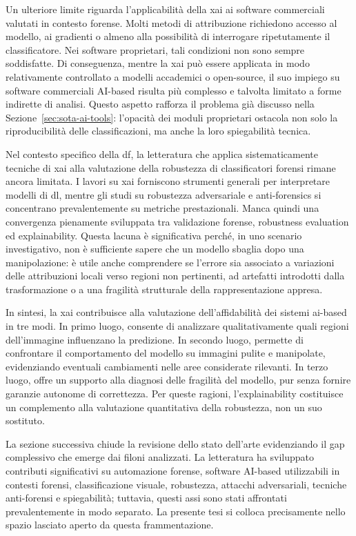 Un ulteriore limite riguarda l'applicabilità della \gls{xai} ai software commerciali valutati in contesto forense. Molti metodi di attribuzione richiedono accesso al modello, ai gradienti o almeno alla possibilità di interrogare ripetutamente il classificatore. Nei software proprietari, tali condizioni non sono sempre soddisfatte. Di conseguenza, mentre la \gls{xai} può essere applicata in modo relativamente controllato a modelli accademici o open-source, il suo impiego su software commerciali AI-based risulta più complesso e talvolta limitato a forme indirette di analisi. Questo aspetto rafforza il problema già discusso nella Sezione~\ref{sec:sota-ai-tools}: l'opacità dei moduli proprietari ostacola non solo la riproducibilità delle classificazioni, ma anche la loro spiegabilità tecnica.

Nel contesto specifico della \gls{df}, la letteratura che applica sistematicamente tecniche di \gls{xai} alla valutazione della robustezza di classificatori forensi rimane ancora limitata. I lavori su \gls{xai} forniscono strumenti generali per interpretare modelli di \gls{dl}, mentre gli studi su robustezza adversariale e anti-forensics si concentrano prevalentemente su metriche prestazionali. Manca quindi una convergenza pienamente sviluppata tra validazione forense, robustness evaluation ed explainability. Questa lacuna è significativa perché, in uno scenario investigativo, non è sufficiente sapere che un modello sbaglia dopo una manipolazione: è utile anche comprendere se l'errore sia associato a variazioni delle attribuzioni locali verso regioni non pertinenti, ad artefatti introdotti dalla trasformazione o a una fragilità strutturale della rappresentazione appresa.

In sintesi, la \gls{xai} contribuisce alla valutazione dell'affidabilità dei sistemi \gls{ai}-based in tre modi. In primo luogo, consente di analizzare qualitativamente quali regioni dell'immagine influenzano la predizione. In secondo luogo, permette di confrontare il comportamento del modello su immagini pulite e manipolate, evidenziando eventuali cambiamenti nelle aree considerate rilevanti. In terzo luogo, offre un supporto alla diagnosi delle fragilità del modello, pur senza fornire garanzie autonome di correttezza. Per queste ragioni, l'explainability costituisce un complemento alla valutazione quantitativa della robustezza, non un suo sostituto.

La sezione successiva chiude la revisione dello stato dell'arte evidenziando il gap complessivo che emerge dai filoni analizzati. La letteratura ha sviluppato contributi significativi su automazione forense, software AI-based utilizzabili in contesti forensi, classificazione visuale, robustezza, attacchi adversariali, tecniche anti-forensi e spiegabilità; tuttavia, questi assi sono stati affrontati prevalentemente in modo separato. La presente tesi si colloca precisamente nello spazio lasciato aperto da questa frammentazione.



